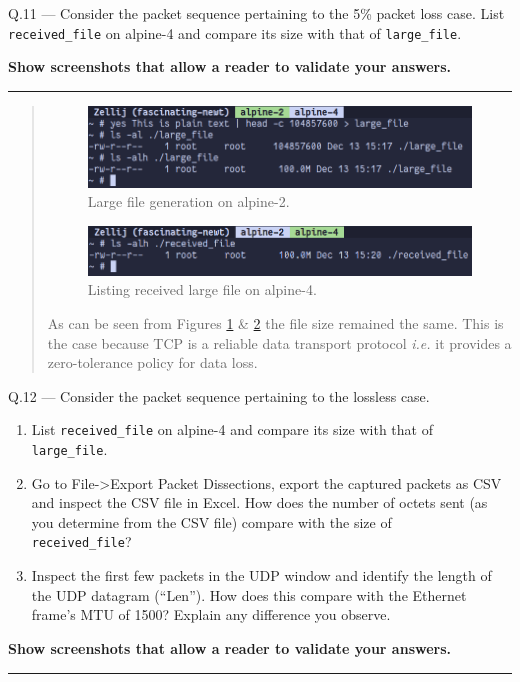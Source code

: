 \documentclass{article}
\newcommand\Que[2]{%
\begin{samepage}
\leavevmode\par
\noindent
Q.#1 --- #2\par\vspace{10pt}\hrule\vspace{10pt}
\end{samepage}}
\newenvironment{ans}
{\fbox{Answer}\begin{quote}\nopagebreak}
{\end{quote}}
\newcommand\ie{\emph{i.e.}}
\begin{document}
\Que{11}{
Consider the packet sequence pertaining to the 5\% packet loss
case. List \texttt{received\_file} on alpine-4 and compare its
size with that of \texttt{large\_file}.

\textbf{Show screenshots that allow a reader to validate your
answers.}}
\begin{ans}
\begin{figure}[H]
\centering
\includegraphics[width=16cm]{data/large-file-alpine-2.png}
\caption{Large file generation on alpine-2.}
\label{fig:file-gen}
\end{figure}

\begin{figure}[H]
\centering
\includegraphics[width=16cm]{data/alpine-4-received-file.png}
\caption{Listing received large file on alpine-4.}
\label{fig:file-receive}
\end{figure}

As can be seen from Figures \ref{fig:file-gen} \&
\ref{fig:file-receive} the file size remained the same. This is
the case because TCP is a reliable data transport protocol \ie{}
it provides a zero-tolerance policy for data loss.
\end{ans}

\newpage

\Que{12}{
Consider the packet sequence pertaining to the lossless case.
\begin{enumerate}
\item List \texttt{received\_file} on alpine-4 and compare its
      size with that of \\ \texttt{large\_file}.
\item Go to File->Export Packet Dissections, export the captured
      packets as CSV and inspect the CSV file in Excel. How does
      the number of octets sent (as you determine from the CSV
      file) compare with the size of\\ \texttt{received\_file}?
\item Inspect the first few packets in the UDP window and
      identify the length of the UDP datagram (``Len''). How does
      this compare with the Ethernet frame's MTU of 1500? Explain
      any difference you observe.
\end{enumerate}

\textbf{Show screenshots that allow a reader to validate your answers.}}
\end{document}
